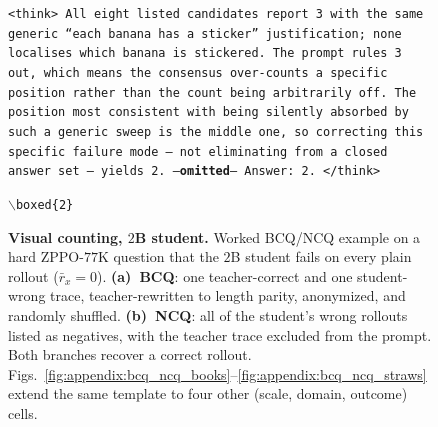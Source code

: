 \documentclass{llmxive}
\begin{document}
\begin{figure}[!p]
\begin{prompttemplatefig}
\smallskip
\texttt{<think> All eight listed candidates report 3 with the same generic ``each banana has a sticker'' justification; none localises which banana is stickered. The prompt rules 3 out, which means the consensus over-counts a specific position rather than the count being arbitrarily off. The position most consistent with being silently absorbed by such a generic sweep is the middle one, so correcting this specific failure mode -- not eliminating from a closed answer set -- yields 2. ---\textbf{omitted}--- Answer: 2. </think>}

\smallskip
\texttt{$\backslash$boxed\{2\}} \quad \checkmark
\end{prompttemplatefig}

\caption{\textbf{Visual counting, $2$B student.} Worked BCQ/NCQ example on a hard ZPPO-$77$K question that the $2$B student fails on every plain rollout ($\bar{r}_x\!=\!0$). \textbf{(a)~BCQ}: one teacher-correct and one student-wrong trace, teacher-rewritten to length parity, anonymized, and randomly shuffled. \textbf{(b)~NCQ}: all of the student's wrong rollouts listed as negatives, with the teacher trace excluded from the prompt. Both branches recover a correct rollout. Figs.~\ref{fig:appendix:bcq_ncq_books}--\ref{fig:appendix:bcq_ncq_straws} extend the same template to four other (scale, domain, outcome) cells.}
\label{fig:appendix:bcq_ncq_qualitative}
\end{figure}
\end{document}
